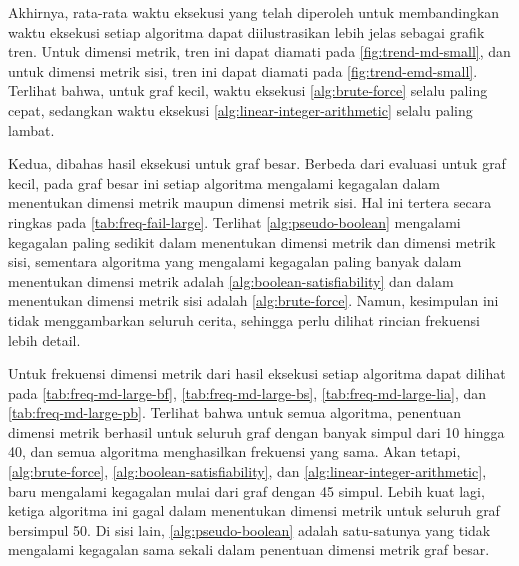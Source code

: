 \documentclass[10pt,twocolumn]{article}
\newcommand{\minipagewidth}{\linewidth}
\begin{document}
Akhirnya, rata-rata waktu eksekusi yang telah diperoleh untuk membandingkan waktu eksekusi setiap algoritma dapat diilustrasikan lebih jelas sebagai grafik tren. Untuk dimensi metrik, tren ini dapat diamati pada \autoref{fig:trend-md-small}, dan untuk dimensi metrik sisi, tren ini dapat diamati pada \autoref{fig:trend-emd-small}. Terlihat bahwa, untuk graf kecil, waktu eksekusi \autoref{alg:brute-force} selalu paling cepat, sedangkan waktu eksekusi \autoref{alg:linear-integer-arithmetic} selalu paling lambat.

\begin{center}
	\renewcommand{\minipagewidth}{0.9\linewidth}

	

	\vspace{1em}

	

\end{center}

Kedua, dibahas hasil eksekusi untuk graf besar. Berbeda dari evaluasi untuk graf kecil, pada graf besar ini setiap algoritma mengalami kegagalan dalam menentukan dimensi metrik maupun dimensi metrik sisi. Hal ini tertera secara ringkas pada \autoref{tab:freq-fail-large}. Terlihat \autoref{alg:pseudo-boolean} mengalami kegagalan paling sedikit dalam menentukan dimensi metrik dan dimensi metrik sisi, sementara algoritma yang mengalami kegagalan paling banyak dalam menentukan dimensi metrik adalah \autoref{alg:boolean-satisfiability} dan dalam menentukan dimensi metrik sisi adalah \autoref{alg:brute-force}. Namun, kesimpulan ini tidak menggambarkan seluruh cerita, sehingga perlu dilihat rincian frekuensi lebih detail.

Untuk frekuensi dimensi metrik dari hasil eksekusi setiap algoritma dapat dilihat pada \autoref{tab:freq-md-large-bf}, \autoref{tab:freq-md-large-bs}, \autoref{tab:freq-md-large-lia}, dan \autoref{tab:freq-md-large-pb}. Terlihat bahwa untuk semua algoritma, penentuan dimensi metrik berhasil untuk seluruh graf dengan banyak simpul dari 10 hingga 40, dan semua algoritma menghasilkan frekuensi yang sama. Akan tetapi, \autoref{alg:brute-force}, \autoref{alg:boolean-satisfiability}, dan \autoref{alg:linear-integer-arithmetic}, baru mengalami kegagalan mulai dari graf dengan 45 simpul. Lebih kuat lagi, ketiga algoritma ini gagal dalam menentukan dimensi metrik untuk seluruh graf bersimpul 50. Di sisi lain, \autoref{alg:pseudo-boolean} adalah satu-satunya yang tidak mengalami kegagalan sama sekali dalam penentuan dimensi metrik graf besar.
\end{document}
